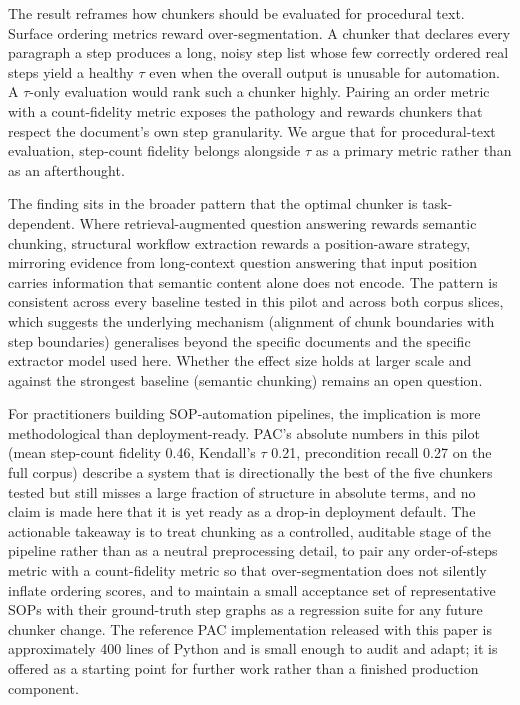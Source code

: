 \documentclass[fleqn,10pt]{wlscirep}
\begin{document}
The result reframes how chunkers should be evaluated for procedural
text. Surface ordering metrics reward over-segmentation. A chunker that
declares every paragraph a step produces a long, noisy step list whose
few correctly ordered real steps yield a healthy $\tau$ even when the
overall output is unusable for automation. A $\tau$-only evaluation
would rank such a chunker highly. Pairing an order metric with a
count-fidelity metric exposes the pathology and rewards chunkers that
respect the document's own step granularity. We argue that for
procedural-text evaluation, step-count fidelity belongs alongside
$\tau$ as a primary metric rather than as an afterthought.

The finding sits in the broader pattern that the optimal chunker is
task-dependent. Where retrieval-augmented question answering rewards
semantic chunking, structural workflow extraction rewards a
position-aware strategy, mirroring evidence from long-context
question answering that input position carries information that
semantic content alone does not encode\cite{liu2024lost}. The pattern
is consistent across every baseline tested in this pilot and across
both corpus slices, which suggests the underlying mechanism (alignment
of chunk boundaries with step boundaries) generalises beyond the
specific documents and the specific extractor model used here. Whether the
effect size holds at larger scale and against the strongest baseline
(semantic chunking) remains an open question.

For practitioners building SOP-automation pipelines, the implication
is more methodological than deployment-ready. PAC's absolute numbers
in this pilot (mean step-count fidelity 0.46, Kendall's $\tau$ 0.21,
precondition recall 0.27 on the full corpus) describe a system that is
directionally the best of the five chunkers tested but still misses a
large fraction of structure in absolute terms, and no claim is made
here that it is yet ready as a drop-in deployment default. The
actionable takeaway is to treat chunking as a controlled, auditable
stage of the pipeline rather than as a neutral preprocessing detail,
to pair any order-of-steps metric with a count-fidelity metric so that
over-segmentation does not silently inflate ordering scores, and to
maintain a small acceptance set of representative SOPs with their
ground-truth step graphs as a regression suite for any future chunker
change. The reference PAC implementation released with this paper is
approximately 400 lines of Python and is small enough to audit and
adapt; it is offered as a starting point for further work rather than
a finished production component.
\end{document}
